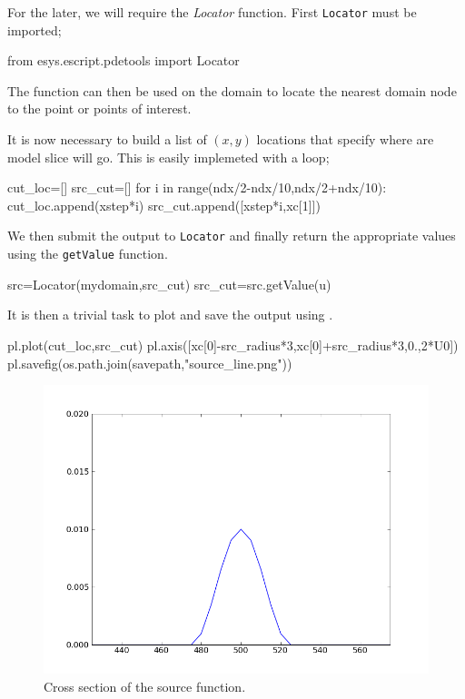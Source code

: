 For the later, we will require the \textit{Locator} function. 
First \verb!Locator! must be imported;
\begin{python}
 from esys.escript.pdetools import Locator
\end{python}
The function can then be used on the domain to locate the nearest domain node
to the point or points of interest.

It is now necessary to build a list of $(x,y)$ locations that specify where are
model slice will go. This is easily implemeted with a loop;
\begin{python}
cut_loc=[]
src_cut=[]
for i in range(ndx/2-ndx/10,ndx/2+ndx/10):
    cut_loc.append(xstep*i)
    src_cut.append([xstep*i,xc[1]])
\end{python}
We then submit the output to \verb!Locator! and finally return the appropriate
values using the \verb!getValue! function.
\begin{python}
 src=Locator(mydomain,src_cut)
src_cut=src.getValue(u)
\end{python}
It is then a trivial task to plot and save the output using \mpl.
\begin{python}
 pl.plot(cut_loc,src_cut)
pl.axis([xc[0]-src_radius*3,xc[0]+src_radius*3,0.,2*U0])
pl.savefig(os.path.join(savepath,"source_line.png"))
\end{python}
\begin{figure}[h]
 \centering
	\includegraphics[width=6in]{figures/sourceline.png}
 \caption{Cross section of the source function.}
 \label{fig:cxsource}
\end{figure}


